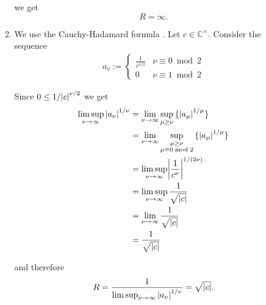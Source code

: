 \begin{enumerate}[label = \textbf{Exercise \arabic*.},wide = 0pt, itemsep=1.5ex]
\begin{enumerate}[label = (\alph*),wide = 0pt, itemsep=1.5ex]
				\noindent we get
				\begin{equation}
					R = \infty.
				\end{equation}

			\item We use the Cauchy-Hadamard formula \cite[99]{remmert2002funktionentheorie}. Let $c \in \mathbb{C}^\times$. Consider the sequence
				\begin{align*}
					a_\nu := \begin{cases}
						\frac{1}{c^{\nu/2}}& \nu \equiv 0 \bmod 2\\
						0 & \nu \equiv 1 \bmod 2
					\end{cases}
				\end{align*}

				Since $0 \leq 1/\abs{c}^{\nu/2}$ we get
				\begin{align*}
					\limsup_{\nu \to \infty} \abs[0]{a_\nu}^{1/\nu} &= \lim_{\nu \to \infty}\sup_{\mu \geq \nu} \cbr[0]{\abs[0]{a_\mu}^{1/\mu}}\\
					&= \lim_{\nu \to \infty}\sup_{\substack{\mu \geq \nu\\\mu \equiv 0 \bmod 2}}\cbr[0]{\abs[0]{a_\mu}^{1/\mu}}\\
					&= \limsup_{\nu \to \infty} \abs[3]{\frac{1}{c^{\nu}}}^{1/(2\nu)}\\
					&= \limsup_{\nu \to \infty} \frac{1}{\sqrt{\abs[0]{c}}}\\
					&= \lim_{\nu \to \infty} \frac{1}{\sqrt{\abs[0]{c}}}\\
					&= \frac{1}{\sqrt{\abs[0]{c}}}
				\end{align*}

				\noindent and therefore
				\begin{equation}
					R = \frac{1}{\limsup_{\nu \to \infty} \abs[0]{a_\nu}^{1/\nu}} = \sqrt{\abs[0]{c}}.
				\end{equation}
		\end{enumerate}


\end{enumerate}

